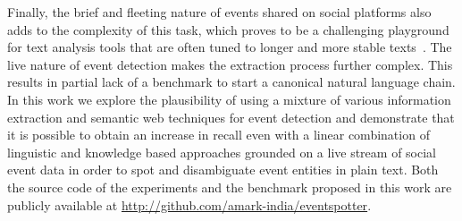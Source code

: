 \documentclass[10pt,a4paper]{article}
\begin{document}
Finally, the brief and fleeting nature of events shared on social platforms also adds to the complexity of this task, which proves to be a challenging playground for text analysis tools that are often tuned to longer and more stable texts~\cite{ERP:2013}.
The live nature of event detection makes the extraction process further complex. This results in partial lack of a benchmark to start a canonical natural language chain. In this work we explore the plausibility of using a mixture of various information extraction and semantic web techniques for event detection and demonstrate that it is possible to obtain an increase in recall even with a linear combination of linguistic and knowledge based approaches grounded on a live stream of social event data in order to spot and disambiguate event entities in plain text. Both the source code of the experiments and the benchmark proposed in this work are publicly available at \url{http://github.com/amark-india/eventspotter}.
\end{document}
